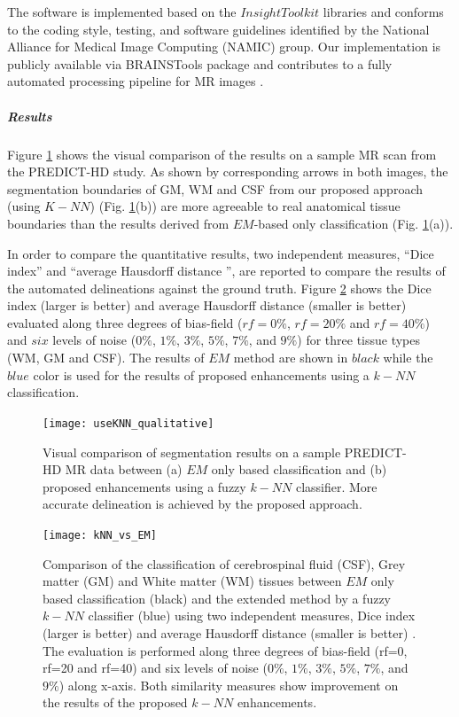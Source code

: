 The software is implemented based on the $InsightToolkit$ libraries \cite{johnson2015itk1, johnson2015itk2} and conforms to the coding style, testing, and software guidelines identified by the National Alliance for Medical Image Computing (NAMIC) group. Our implementation is publicly available via BRAINSTools package \cite{BRAINSTools} and contributes to a fully automated processing pipeline for MR images \cite{Kim2014,Pierson2011}.

\subparagraph{Results} %

Figure \ref{useKNN_qualitative} shows the visual comparison of the results on a sample MR scan from the PREDICT-HD study. As shown by corresponding arrows in both images, the segmentation boundaries of GM, WM and CSF from our proposed approach (using $K-NN$) (Fig. \ref{useKNN_qualitative}(b)) are more agreeable to real anatomical tissue boundaries than the results derived from $EM$-based only classification (Fig. \ref{useKNN_qualitative}(a)).

In  order  to  compare  the  quantitative  results, two independent measures, ``Dice index'' and ``average Hausdorff distance \cite{Dubuisson1994}'', are reported to compare the results of the automated delineations against the ground truth. Figure \ref{kNN_vs_EM} shows the Dice index (larger is better) and average Hausdorff distance (smaller is better) evaluated along three degrees of bias-field ($rf=0\%$, $rf=20\%$ and $rf=40\%$) and $six$ levels of noise ($0\%$, $1\%$, $3\%$, $5\%$, $7\%$, and $9\%$) for three tissue types (WM, GM and CSF). The results of $EM$ method are shown in $black$ while the $blue$ color is used for the results of proposed enhancements using a $k-NN$ classification.

\begin{figure}
\centering
\texttt{[image: useKNN\_qualitative]}\
\centering
\caption{Visual comparison of segmentation results on a sample PREDICT-HD MR data between (a) $EM$ only based classification and (b) proposed enhancements using a fuzzy $k-NN$ classifier. More accurate delineation is achieved by the proposed approach.}
\label{useKNN_qualitative}
\end{figure}

\begin{figure}
\centering
\texttt{[image: kNN\_vs\_EM]}\
\centering
\caption{Comparison of the classification of cerebrospinal fluid (CSF), Grey matter (GM) and White matter (WM) tissues between $EM$ only based classification (black) and the extended method by a fuzzy $k-NN$ classifier (blue) using two independent measures, Dice index (larger is better) and average Hausdorff distance (smaller is better) . The evaluation is performed along three degrees of bias-field (rf=0, rf=20 and rf=40) and six levels of noise ($0\%$, $1\%$, $3\%$, $5\%$, $7\%$, and $9\%$) along x-axis. Both similarity measures show improvement on the results of the proposed $k-NN$ enhancements.}
\label{kNN_vs_EM}
\end{figure}


